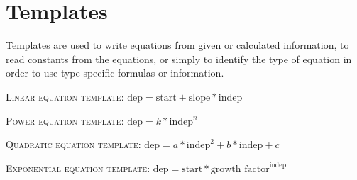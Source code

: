 
\section*{Templates}

\bigskip

Templates are used to write equations from given or calculated information, to read constants from the equations, or simply to identify the type of equation in order to use type-specific formulas or information.

\bigskip
\bigskip
\bigskip

\noindent \hrulefill

 \bigskip
  \bigskip

\noindent  \textsc{Linear equation template:} \quad $\text{dep}=\text{start}+\text{slope}\ast\text{indep}$

 \bigskip
  \bigskip
 
\noindent  \textsc{Power equation template:} \quad $\text{dep} = k \ast \text{indep}^{n}$

 \bigskip
  \bigskip
 
\noindent  \textsc{Quadratic equation template:} \quad $\text{dep} = a \ast \text{indep}^2 + b \ast\text{indep} + c$

 \bigskip
  \bigskip

 
\noindent   \textsc{Exponential equation template:} \quad $\text{dep} = \text{start} \ast \text{growth factor} ^ {\text{indep}}$

 \bigskip
  \bigskip
 
 \noindent \hrulefill
 
 \vfill

 
 
